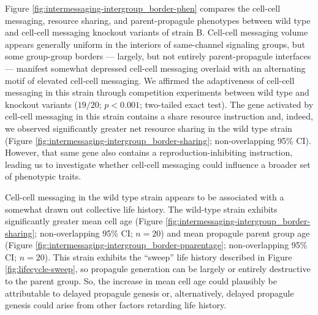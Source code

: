 

Figure \ref{fig:intermessaging-intergroup_border-phen} compares the cell-cell messaging, resource sharing, and parent-propagule phenotypes between wild type and cell-cell messaging knockout variants of strain B.
Cell-cell messaging volume appears generally uniform in the interiors of same-channel signaling groups, but some group-group borders --- largely, but not entirely parent-propagule interfaces --- manifest somewhat depressed cell-cell messaging overlaid with an alternating motif of elevated cell-cell messaging.
We affirmed the adaptiveness of cell-cell messaging in this strain through competition experiments between wild type and knockout variants ($19/20$; $p < 0.001$; two-tailed exact test).
The gene activated by cell-cell messaging in this strain contains a share resource instruction and, indeed, we observed significantly greater net resource sharing in the wild type strain (Figure \ref{fig:intermessaging-intergroup_border-sharing}; non-overlapping 95\% CI).
However, that same gene also contains a reproduction-inhibiting instruction, leading us to investigate whether cell-cell messaging could influence a broader set of phenotypic traits.

Cell-cell messaging in the wild type strain appears to be associated with a somewhat drawn out collective life history.
The wild-type strain exhibits significantly greater mean cell age (Figure \ref{fig:intermessaging-intergroup_border-sharing}; non-overlapping 95\% CI; $n=20$) and mean propagule parent group age (Figure \ref{fig:intermessaging-intergroup_border-pparentage}; non-overlapping 95\% CI; $n=20$).
This strain exhibits the ``sweep'' life history described in Figure \ref{fig:lifecycle-sweep}, so propagule generation can be largely or entirely destructive to the parent group.
So, the increase in mean cell age could plausibly be attributable to delayed propagule genesis or, alternatively, delayed propagule genesis could arise from other factors retarding life history.

